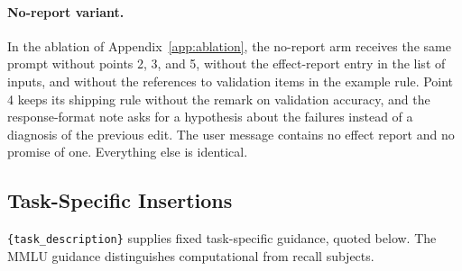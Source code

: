 \documentclass[10pt]{article} %
\begin{document}
\paragraph{No-report variant.}
In the ablation of Appendix~\ref{app:ablation}, the no-report arm receives the same prompt without points 2, 3, and 5,
without the effect-report entry in the list of inputs, and without the references to validation items in the example
rule. Point 4 keeps its shipping rule without the remark on validation accuracy, and the response-format note asks for
a hypothesis about the failures instead of a diagnosis of the previous edit. The user message contains no effect
report and no promise of one. Everything else is identical.

\subsection{Task-Specific Insertions}
\label{app:insertions}
\texttt{\{task\_description\}} supplies fixed task-specific guidance, quoted below. The MMLU
guidance distinguishes computational from recall subjects.
\end{document}
